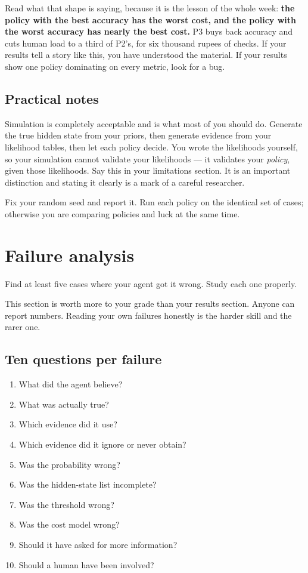 \documentclass[11pt,a4paper]{article}
\begin{document}
Read what that shape is saying, because it is the lesson of the whole week: \textbf{the policy
with the best accuracy has the worst cost, and the policy with the worst accuracy has nearly the
best cost.} P3 buys back accuracy and cuts human load to a third of P2's, for six thousand rupees
of checks. If your results tell a story like this, you have understood the material. If your
results show one policy dominating on every metric, look for a bug.

\subsection{Practical notes}

Simulation is completely acceptable and is what most of you should do. Generate the true hidden
state from your priors, then generate evidence from your likelihood tables, then let each policy
decide. You wrote the likelihoods yourself, so your simulation cannot validate your likelihoods
--- it validates your \emph{policy}, given those likelihoods. Say this in your limitations
section. It is an important distinction and stating it clearly is a mark of a careful researcher.

Fix your random seed and report it. Run each policy on the identical set of cases; otherwise you
are comparing policies and luck at the same time.

\section{Failure analysis}
\label{sec:failure}

Find at least five cases where your agent got it wrong. Study each one properly.

This section is worth more to your grade than your results section. Anyone can report numbers.
Reading your own failures honestly is the harder skill and the rarer one.

\subsection{Ten questions per failure}

\begin{enumerate}[itemsep=1pt]
  \item What did the agent believe?
  \item What was actually true?
  \item Which evidence did it use?
  \item Which evidence did it ignore or never obtain?
  \item Was the probability wrong?
  \item Was the hidden-state list incomplete?
  \item Was the threshold wrong?
  \item Was the cost model wrong?
  \item Should it have asked for more information?
  \item Should a human have been involved?
\end{enumerate}
\end{document}
